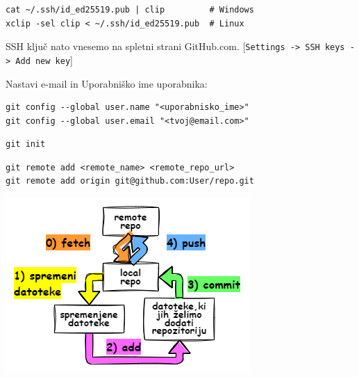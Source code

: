 \documentclass{article}
\begin{document}
\begin{multicols*}{2}
\begin{codebox}[black]
\begin{lstlisting}
cat ~/.ssh/id_ed25519.pub | clip         # Windows
xclip -sel clip < ~/.ssh/id_ed25519.pub  # Linux
\end{lstlisting}
\end{codebox}

\begin{textbox}[black]
SSH ključ nato vnesemo na spletni strani GitHub.com.
[\lstinline{Settings -> SSH keys -> Add new key}]
\end{textbox}

\vfill\null
\columnbreak
{}

\begin{textbox}[black]
    Nastavi e-mail in Uporabniško ime uporabnika:
\end{textbox}

\begin{codebox}[black]
\begin{lstlisting}
git config --global user.name "<uporabnisko_ime>"
git config --global user.email "<tvoj@email.com>"
\end{lstlisting}
\end{codebox}


\begin{codebox}[black]
\begin{lstlisting}
git init
\end{lstlisting}
\end{codebox}

\begin{codebox}[black]
\begin{lstlisting}
git remote add <remote_name> <remote_repo_url>
git remote add origin git@github.com:User/repo.git
\end{lstlisting}
\end{codebox}

{}

\begin{textbox}[black]
\begin{center}
    \includegraphics[width=0.8\linewidth]{images/git-workflow.png}
\end{center}
\end{textbox}


\end{multicols*}
\end{document}
